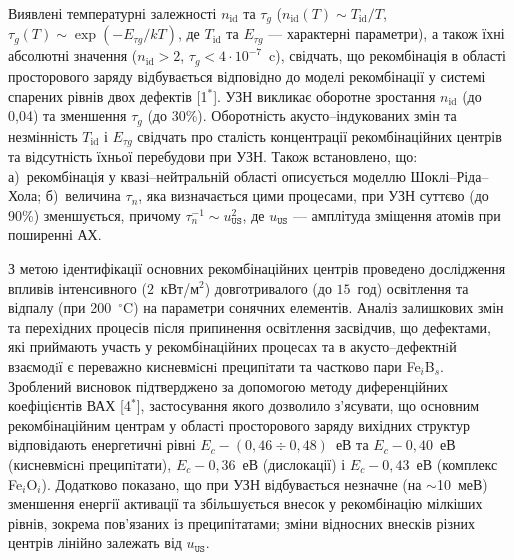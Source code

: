 Виявлені температурні залежності $n_\mathrm{id}$ та $\tau_g$
($n_{\mathrm{id}}(T) \sim T_{\mathrm{id}}/T$,
$\tau_{g}(T)\sim\exp\left(-E_{\tau g}/kT\right)$,
де $T_{\mathrm{id}}$ та $E_{\tau g}$ --- характерні параметри),
а також їхні абсолютні значення ($n_{\mathrm{id}}>2$, $\tau_{g}<4\cdot10^{-7}$~c),
свідчать, що рекомбінація в області просторового заряду відбувається відповідно до
моделі рекомбінації у системі спарених рівнів двох дефектів
[1$^*$].
УЗН викликає оборотне зростання $n_\mathrm{id}$  (до 0,04) та зменшення $\tau_g$ (до 30\%).
Оборотність акусто--індукованих змін та незмінність $T_{\mathrm{id}}$ і $E_{\tau g}$
свідчать про
сталість концентрації рекомбінаційних центрів та відсутність їхньої перебудови при УЗН.
Також встановлено, що:
а)~рекомбінація у квазі--нейтральній області описується моделлю Шоклі--Ріда--Хола;
б)~величина $\tau_n$, яка визначається цими процесами,
при УЗН суттєво (до 90\%) зменшується,
причому
$\tau_{n}^{-1}\sim u_\mathtt{US}^2$,
де $u_\mathtt{US}$ --- амплітуда зміщення атомів при поширенні АХ.

З метою ідентифікації основних рекомбінаційних центрів
 проведено дослідження впливів інтенсивного ($2$~кВт/м$^2$) довготривалого (до  $15$~год) освітлення
та відпалу (при 200~$^\circ$C) на параметри сонячних елементів.
Аналіз залишкових змін та перехідних процесів після припинення освітлення засвідчив, що дефектами, які приймають участь у рекомбінаційних процесах та в акусто--дефектнiй взаємодiї є переважно кисневмiснi преципiтати та
частково пари Fe$_i$B$_s$.
Зроблений висновок підтверджено за допомогою методу диференційних коефіцієнтів ВАХ
[4$^*$],
застосування якого дозволило з'ясувати, що основним рекомбінаційним центрам у області просторового заряду вихідних структур відповідають енергетичні рівні
$E_c-(0,46\div0,48)$~еВ та $E_c-0,40$~еВ (кисневмiснi преципiтати),
$E_c-0,36$~еВ (дислокації) і
$E_c-0,43$~еВ (комплекс Fe$_i$O$_i$).
Додатково показано, що
при УЗН відбувається незначне (на $\sim$10~меВ) зменшення енергії активації та
збільшується внесок у рекомбінацію мілкіших рівнів, зокрема пов'язаних із преципітатами;
зміни відносних внесків різних центрів лінійно залежать від $u_\mathtt{US}$.


